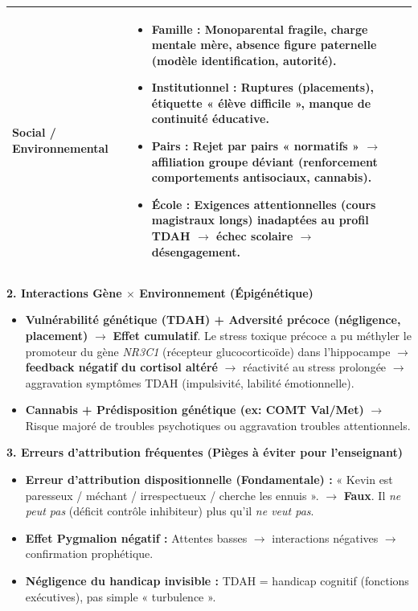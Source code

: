 \documentclass[11pt]{article}
\begin{document}
\begin{exoresolu}
\begin{center}
\begin{tabularx}{\linewidth}{|l|X|}
\textbf{Social / Environnemental} & \begin{itemize}\item \textbf{Famille :} Monoparental fragile, charge mentale mère, absence figure paternelle (modèle identification, autorité). \item \textbf{Institutionnel :} Ruptures (placements), étiquette « élève difficile », manque de continuité éducative. \item \textbf{Pairs :} Rejet par pairs « normatifs » $\to$ affiliation groupe déviant (renforcement comportements antisociaux, cannabis). \item \textbf{École :} Exigences attentionnelles (cours magistraux longs) inadaptées au profil TDAH $\to$ échec scolaire $\to$ désengagement. \end{itemize} \\ \hline
\end{tabularx}
\end{center}

\textbf{2. Interactions Gène $\times$ Environnement (Épigénétique)}
\begin{itemize}
    \item \textbf{Vulnérabilité génétique (TDAH) + Adversité précoce (négligence, placement)} $\to$ \textbf{Effet cumulatif}. Le stress toxique précoce a pu méthyler le promoteur du gène \textit{NR3C1} (récepteur glucocorticoïde) dans l'hippocampe $\to$ \textbf{feedback négatif du cortisol altéré} $\to$ réactivité au stress prolongée $\to$ aggravation symptômes TDAH (impulsivité, labilité émotionnelle).
    \item \textbf{Cannabis + Prédisposition génétique (ex: COMT Val/Met)} $\to$ Risque majoré de troubles psychotiques ou aggravation troubles attentionnels.
\end{itemize}

\textbf{3. Erreurs d'attribution fréquentes (Pièges à éviter pour l'enseignant)}
\begin{itemize}
    \item \textbf{Erreur d'attribution dispositionnelle (Fondamentale) :} « Kevin est paresseux / méchant / irrespectueux / cherche les ennuis ». $\to$ \textbf{Faux}. Il \emph{ne peut pas} (déficit contrôle inhibiteur) plus qu'il \emph{ne veut pas}.
    \item \textbf{Effet Pygmalion négatif :} Attentes basses $\to$ interactions négatives $\to$ confirmation prophétique.
    \item \textbf{Négligence du handicap invisible :} TDAH = handicap cognitif (fonctions exécutives), pas simple « turbulence ».
\end{itemize}


\end{exoresolu}
\end{document}
